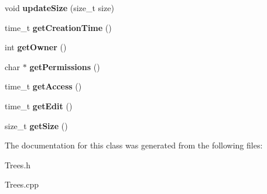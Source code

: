 \begin{DoxyCompactItemize}
void {\bfseries update\+Size} (size\+\_\+t size)
\item 
\mbox{\label{classAttributes_ac6436c08d31dfa33783feee3469a88e9}} 
time\+\_\+t {\bfseries get\+Creation\+Time} ()
\item 
\mbox{\label{classAttributes_a378205f2087ee66d95eb58aa5d7fb040}} 
int {\bfseries get\+Owner} ()
\item 
\mbox{\label{classAttributes_af538b17bd7a459f4664446c574d83bd5}} 
char $\ast$ {\bfseries get\+Permissions} ()
\item 
\mbox{\label{classAttributes_a1b366a9e556ab09004064f23e84f6fcb}} 
time\+\_\+t {\bfseries get\+Access} ()
\item 
\mbox{\label{classAttributes_a7b646531a3cb941912802eed0ef91f54}} 
time\+\_\+t {\bfseries get\+Edit} ()
\item 
\mbox{\label{classAttributes_af9970a8e76e48221ec9d7832e1e558a3}} 
size\+\_\+t {\bfseries get\+Size} ()
\end{DoxyCompactItemize}


The documentation for this class was generated from the following files\+:\begin{DoxyCompactItemize}
\item 
Trees.\+h\item 
Trees.\+cpp\end{DoxyCompactItemize}

